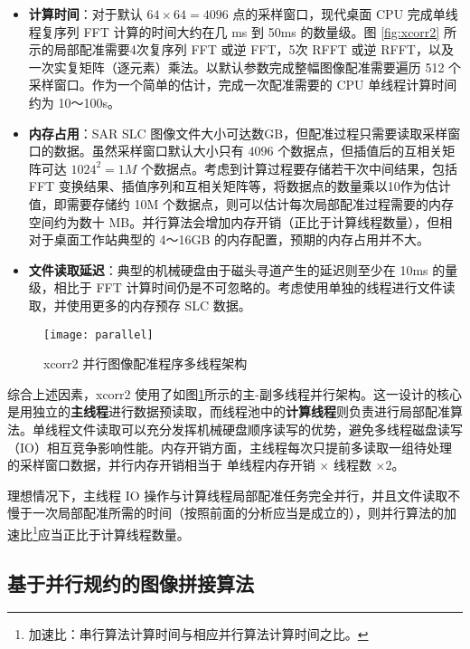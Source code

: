 \begin{itemize}
    \item \textbf{计算时间}：对于默认 $64 \times 64 = 4096$ 点的采样窗口，现代桌面 CPU 完成单线程复序列 FFT 计算的时间大约在几 ms 到 50ms 的数量级\cite{fftwbench}。图 \ref{fig:xcorr2} 所示的局部配准需要4次复序列 FFT 或逆 FFT，5次 RFFT 或逆 RFFT，以及一次实复矩阵（逐元素）乘法。以默认参数完成整幅图像配准需要遍历 512 个采样窗口。作为一个简单的估计，完成一次配准需要的 CPU 单线程计算时间约为 10～100s。
    \item \textbf{内存占用}：SAR SLC 图像文件大小可达数GB，但配准过程只需要读取采样窗口的数据。虽然采样窗口默认大小只有 $4096$ 个数据点，但插值后的互相关矩阵可达 $1024^2 = 1M$ 个数据点。考虑到计算过程要存储若干次中间结果，包括 FFT 变换结果、插值序列和互相关矩阵等，将数据点的数量乘以10作为估计值，即需要存储约 10M 个数据点，则可以估计每次局部配准过程需要的内存空间约为数十 MB。并行算法会增加内存开销（正比于计算线程数量），但相对于桌面工作站典型的 4～16GB 的内存配置，预期的内存占用并不大。
    \item \textbf{文件读取延迟}：典型的机械硬盘由于磁头寻道产生的延迟则至少在 10ms 的量级\cite{wiki:hddcharacter}，相比于 FFT 计算时间仍是不可忽略的。考虑使用单独的线程进行文件读取，并使用更多的内存预存 SLC 数据。
\end{itemize}

\begin{figure}[ht]
\centering
\texttt{[image: parallel]}
\caption{xcorr2 并行图像配准程序多线程架构} \label{fig:parallel}
\end{figure}

综合上述因素，xcorr2 使用了如图\ref{fig:parallel}所示的主-副多线程并行架构。这一设计的核心是用独立的\textbf{主线程}进行数据预读取，而线程池中的\textbf{计算线程}则负责进行局部配准算法。单线程文件读取可以充分发挥机械硬盘顺序读写的优势，避免多线程磁盘读写（IO）相互竞争影响性能。内存开销方面，主线程每次只提前多读取一组待处理的采样窗口数据，并行内存开销相当于 单线程内存开销 $\times$ 线程数 $\times 2$。

理想情况下，主线程 IO 操作与计算线程局部配准任务完全并行，并且文件读取不慢于一次局部配准所需的时间（按照前面的分析应当是成立的），则并行算法的加速比\footnote{加速比：串行算法计算时间与相应并行算法计算时间之比。}应当正比于计算线程数量。

\subsection{基于并行规约的图像拼接算法}

